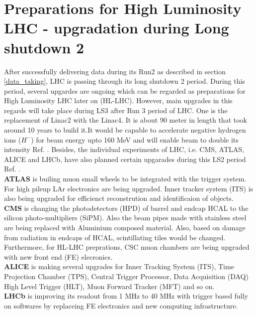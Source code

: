 \section{Preparations for High Luminosity LHC - upgradation during Long shutdown 2} \label{LHC_upgrade}
After successfully delivering data during its Run2 as described in section \ref{data_taking}, LHC is passing through its long shutdown 2 period. During this period, several upgardes are ongoing which can be regarded as preparations for High Luminosity LHC later on (HL-LHC). However, main upgrades in this regards will take place during LS3 after Run 3 period of LHC.
One is the replacement of Linac2 with the Linac4. It is about 90 meter in length that took around 10 years to build it.It would be capable to accelerate negative hydrogen ions ($H^{-}$) for beam energy upto 160 MeV and will enable beam to double its intensity Ref. \cite{CERN:news_linac2}. %
Besides, the individual experiments of LHC, i.e. CMS, ATLAS, ALICE and LHCb, have also planned certain upgarades during this LS2 period Ref. \cite{CERN:LS2_upgrades}.\\ %
\textbf{ATLAS} is builing muon small wheels to be integrated with the trigger system. For high pileup LAr electronics are being upgraded. Inner tracker system (ITS) is also being upgraded for efficienct reconstrution and identificaion of objects. \\
\textbf{CMS} is changing the photodetectors (HPD) of barrel and endcap HCAL to the silicon photo-multipliers (SiPM). Also the beam pipes made with stainless steel are being replaced with Aluminium composed material. Also, based on damage from radiation in endcaps of HCAL, scintillating tiles would be changed. Furthermore, for HL-LHC preprations, CSC muon chambers are being upgraded with new front end (FE) elecronics.\\
\textbf{ALICE} is making several upgrades for Inner Tracking System (ITS), Time Projection Chamber (TPS), Central Trigger Processor, Data Acquisition (DAQ) High Level Trigger (HLT), Muon Forward Tracker (MFT) and so on. \\
\textbf{LHCb} is improving its readout from 1 MHz to 40 MHz with trigger based fully on softwares by replaceing FE electronics and new computing infrastructure.
\clearpage
